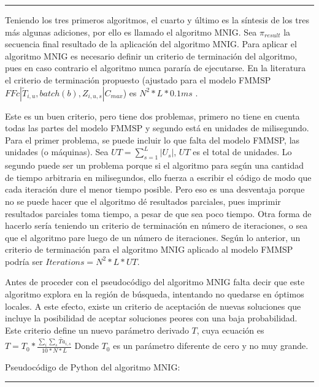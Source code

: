 \documentclass{article}
\def\notac_modelo{$FFc | \tilde{T}_{i, u}, batch(b), Z_{i, u, s} | C_{max}$}
\begin{document}
\noindent\noindent
\rule{\linewidth}{0.4pt}

\vspace{\baselineskip}
Teniendo los tres primeros algoritmos, el cuarto y último es la síntesis de los tres más algunas adiciones, por ello es llamado el algoritmo MNIG. Sea $\pi_{result}$ la secuencia final resultado de la aplicación del algoritmo MNIG. Para aplicar el algoritmo MNIG es necesario definir un criterio de terminación del algoritmo, pues en caso contrario el algoritmo nunca pararía de ejecutarse. En la literatura el criterio de terminación propuesto (ajustado para el modelo FMMSP \notac_modelo) es $N^2*L*0.1ms$ \autocite{algMNIG}. 

\vspace{\baselineskip}
Este es un buen criterio, pero tiene dos problemas, primero no tiene en cuenta todas las partes del modelo FMMSP y segundo está en unidades de milisegundo. Para el primer problema, se puede incluir lo que falta del modelo FMMSP, las unidades (o máquinas). Sea $UT = \sum_{s = 1}^{L}|U_{s}|$, $UT$ es el total de unidades. Lo segundo puede ser un problema porque si el algoritmo para según una cantidad de tiempo arbitraria en milisegundos, ello fuerza a escribir el código de modo que cada iteración dure el menor tiempo posible. Pero eso es una desventaja porque no se puede hacer que el algoritmo dé resultados parciales, pues imprimir resultados parciales toma tiempo, a pesar de que sea poco tiempo. Otra forma de hacerlo sería teniendo un criterio de terminación en número de iteraciones, o sea que el algoritmo pare luego de un número de iteraciones. Según lo anterior, un criterio de terminación para el algoritmo MNIG aplicado al modelo FMMSP podría ser $Iterations = N^2*L*UT$.

\vspace{\baselineskip}
Antes de proceder con el pseudocódigo del algoritmo MNIG falta decir que este algoritmo explora en la región de búsqueda, intentando no quedarse en óptimos locales. A este efecto, existe un criterio de aceptación de nuevas soluciones que incluye la posibilidad de aceptar soluciones peores con una baja probabilidad. Este criterio define un nuevo parámetro derivado $T$, cuya ecuación es $T = T_{0}*\frac{\sum_{i}\sum_{s}\widetilde{Ta}_{i,s}}{10*N*L}$ Donde $T_{0}$ es un parámetro diferente de cero y no muy grande. \autocite{algMNIG}

\vspace{\baselineskip}
Pseudocódigo de Python del algoritmo MNIG:

\noindent\noindent
\rule{\linewidth}{0.4pt}
\end{document}

